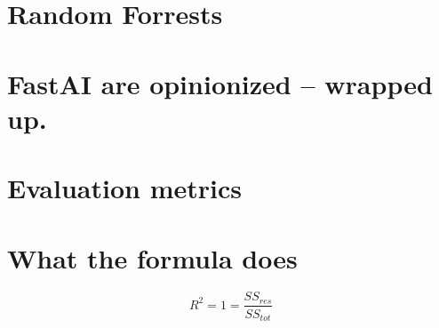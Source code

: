 \documentclass[11pt]{article}
\author{Monib Ahmed}
\date{\today}
\title{}
\begin{document}
\tableofcontents

\section{Random Forrests}
\label{sec:org9f2055a}

\section{FastAI are opinionized -- wrapped up.}
\label{sec:orga184793}

\section{Evaluation metrics}
\label{sec:orgac47853}

\section{What the formula does}
\label{sec:orgf756b8d}


$$ R^2 = 1 = \frac{SS_{res}}{SS_{tot}} $$
\end{document}
